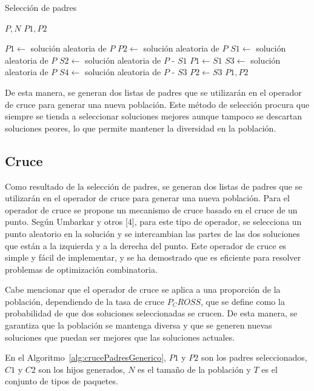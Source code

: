 \begin{algorithm}[H]
\caption{Selección de padres}\label{alg:seleccionPadres}
\begin{algorithmic}[1]
\Require $P, N$
\Ensure $P1, P2$

\State $P1 \leftarrow$ solución aleatoria de $P$
\State $P2 \leftarrow$ solución aleatoria de $P$
    \State $S1 \leftarrow$ solución aleatoria de $P$
    \State $S2 \leftarrow$ solución aleatoria de $P$ - $S1$
        \State $P1 \leftarrow S1$
    \EndIf
    \State $S3 \leftarrow$ solución aleatoria de $P$
    \State $S4 \leftarrow$ solución aleatoria de $P$ - $S3$
        \State $P2 \leftarrow S3$
    \EndIf
\EndFor
\State \Return $P1, P2$
\end{algorithmic}
\end{algorithm}

De esta manera, se generan dos listas de padres que se utilizarán en el operador de cruce para generar una nueva población. Este método de selección procura que siempre se tienda a seleccionar soluciones mejores aunque tampoco se descartan soluciones peores, lo que permite mantener la diversidad en la población.

\subsection{Cruce}

Como resultado de la selección de padres, se generan dos listas de padres que se utilizarán en el operador de cruce para generar una nueva población. Para el operador de cruce se propone un mecanismo de cruce basado en el cruce de un punto. Según Umbarkar y otros [4], para este tipo de operador, se selecciona un punto aleatorio en la solución y se intercambian las partes de las dos soluciones que están a la izquierda y a la derecha del punto. Este operador de cruce es simple y fácil de implementar, y se ha demostrado que es eficiente para resolver problemas de optimización combinatoria.

Cabe mencionar que el operador de cruce se aplica a una proporción de la población, dependiendo de la tasa de cruce $P_CROSS$, que se define como la probabilidad de que dos soluciones seleccionadas se crucen. De esta manera, se garantiza que la población se mantenga diversa y que se generen nuevas soluciones que puedan ser mejores que las soluciones actuales.

En el Algoritmo~\ref{alg:crucePadresGenerico}, $P1$ y $P2$ son los padres seleccionados, $C1$ y $C2$ son los hijos generados, $N$ es el tamaño de la población y $T$ es el conjunto de tipos de paquetes.

